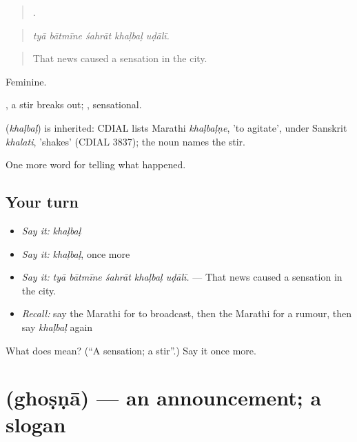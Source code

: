 \begin{quote}
    .
\end{quote}

\begin{quote}
\emph{tyā bātmīne śahrāt khaḷbaḷ uḍālī.}
\end{quote}

\begin{quote}
That news caused a sensation in the city.
\end{quote}

Feminine.

 , a stir breaks out; , sensational.

\begin{cousinweb}
\textbf{} (\emph{khaḷbaḷ}) is inherited: CDIAL lists Marathi \emph{khaḷbaḷṇe}, 'to agitate', under Sanskrit \emph{khalati}, 'shakes' (CDIAL 3837); the noun names the stir.
\end{cousinweb}

\begin{grammarlens}[title={What you've built}]
One more word for telling what happened.
\end{grammarlens}

\subsection*{Your turn}
\begin{itemize}
\raggedright
  \item \emph{Say it:} \emph{khaḷbaḷ}
  \item \emph{Say it:} \emph{khaḷbaḷ}, once more
  \item \emph{Say it:} \emph{tyā bātmīne śahrāt khaḷbaḷ uḍālī.} — That news caused a sensation in the city.
  \item \emph{Recall:} say the Marathi for to broadcast, then the Marathi for a rumour, then say \emph{khaḷbaḷ} again
\end{itemize}

\begin{tcolorbox}[breakable,colback=teal!4,colframe=teal!35!black,title={Before you move on}]
What does  mean? (\textquotedblleft{}A sensation; a stir\textquotedblright{}.) Say it once more.
\end{tcolorbox}
\section[\texorpdfstring{\mr{घोषणा} (ghoṣṇā)}{घोषणा (ghoṣṇā)}]{ (ghoṣṇā) — an announcement; a slogan}

